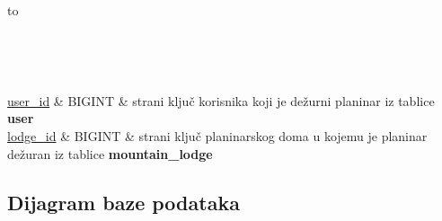 			\begin{longtabu} to \textwidth {|X[6, l]|X[6, l]|X[20, l]|}
				
				\hline {}	 \\[3pt] \hline
				\endfirsthead
				
				\hline {}	 \\[3pt] \hline
				\endhead
				
				\hline 
				\endlastfoot
				
				\underline{user\_id} & BIGINT	& strani ključ korisnika koji je dežurni planinar iz tablice \textbf{user}	\\ \hline
				\underline{lodge\_id}	& BIGINT &   strani ključ planinarskog doma u kojemu je planinar dežuran iz tablice \textbf{mountain\_lodge}	\\ \hline 
				
				
			\end{longtabu}
			\vspace{10mm}



			\subsection{Dijagram baze podataka}
				
